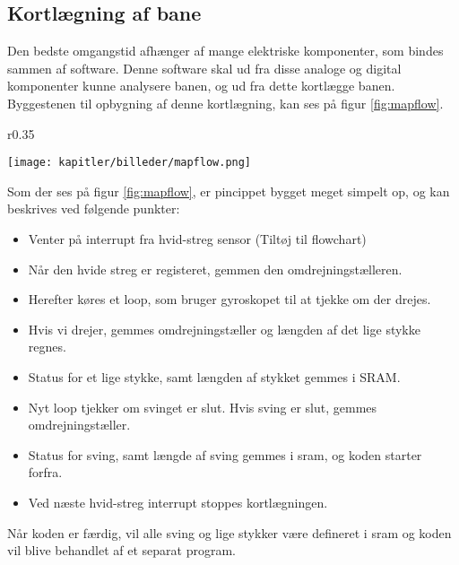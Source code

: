 \newpage
\subsection{Kortlægning af bane}
Den bedste omgangstid afhænger af mange elektriske komponenter, som bindes sammen af software.
Denne software skal ud fra disse analoge og digital komponenter kunne analysere banen, og ud fra dette
kortlægge banen. Byggestenen til opbygning af denne kortlægning, kan ses på figur \ref{fig:mapflow}.

\begin{wrapfigure}{r}{0.35\textwidth}
  \vspace{-10pt}
  \begin{center}
      \texttt{[image: kapitler/billeder/mapflow.png]}
    \end{center}
    \vspace{-10pt}
    \caption{Viser grundstenene af koden til kortlægning af banen.}
    \label{fig:mapflow}
\end{wrapfigure}

Som der ses på figur \ref{fig:mapflow}, er pincippet bygget meget simpelt op, og kan beskrives ved følgende punkter:

\begin{itemize}
\item Venter på interrupt fra hvid-streg sensor (Tiltøj til flowchart)
\item Når den hvide streg er registeret, gemmen den omdrejningstælleren.
\item Herefter køres et loop, som bruger gyroskopet til at tjekke om der drejes.
\item Hvis vi drejer, gemmes omdrejningstæller og længden af det lige stykke regnes.
\item Status for et lige stykke, samt længden af stykket gemmes i SRAM.
\item Nyt loop tjekker om svinget er slut. Hvis sving er slut, gemmes omdrejningstæller.
\item Status for sving, samt længde af sving gemmes i sram, og koden starter forfra.
\item Ved næste hvid-streg interrupt stoppes kortlægningen.
\end{itemize}

Når koden er færdig, vil alle sving og lige stykker være defineret i sram og koden vil blive behandlet
af et separat program.

